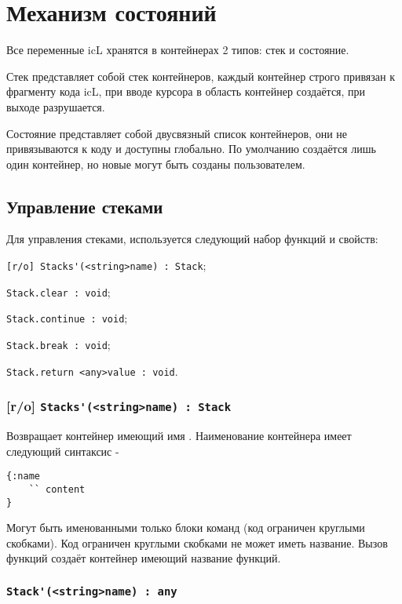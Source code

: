 \section{Механизм состояний}

Все переменные icL хранятся в контейнерах 2 типов: стек и состояние.

Стек представляет собой стек контейнеров, каждый контейнер строго привязан к фрагменту кода icL, при вводе курсора в область контейнер создаётся, при выходе разрушается.

Состояние представляет собой двусвязный список контейнеров, они не привязываются к коду и доступны глобально. По умолчанию создаётся лишь один контейнер, но новые могут быть созданы пользователем.

\subsection{Управление стеками}

Для управления стеками, используется следующий набор функций и свойств:
\begin{icItems}
	\item \lstinline|[r/o] Stacks'(<string>name) : Stack|;
	\item \lstinline|Stack.clear : void|;
	\item \lstinline|Stack.continue : void|;
	\item \lstinline|Stack.break : void|;
	\item \lstinline|Stack.return <any>value : void|.
\end{icItems}

\subsubsection{[r/o] \lstinline|Stacks'(<string>name) : Stack|}

Возвращает контейнер имеющий имя . Наименование контейнера имеет следующий синтаксис -
\begin{lstlisting}[numbers=none]
{:name
	`` content
}
\end{lstlisting}
Могут быть именованными только блоки команд (код ограничен круглыми скобками). Код ограничен круглыми скобками не может иметь название. Вызов функций создаёт контейнер имеющий название функций.

\subsubsection{\lstinline|Stack'(<string>name) : any|}

